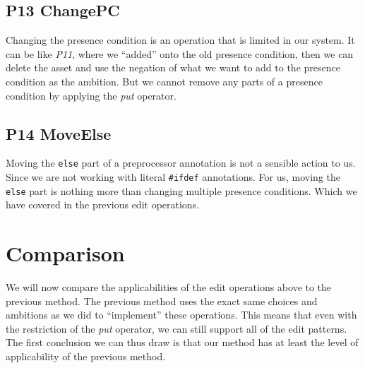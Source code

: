 \subsection*{P13 ChangePC}
Changing the presence condition is an operation that is limited in our system.
It can be like \emph{P11}, where we ``added'' onto the old presence condition,
then we can delete the asset and use the negation of what we want to add to
the presence condition as the ambition. But we cannot remove any parts of a
presence condition by applying the \emph{put} operator.

\subsection*{P14 MoveElse}
Moving the \texttt{else} part of a preprocessor annotation is not a sensible action
to us. Since we are not working with literal \texttt{\#ifdef} annotations. For
us, moving the \texttt{else} part is nothing more than changing multiple presence
conditions. Which we have covered in the previous edit operations.

\section{Comparison}
We will now compare the applicabilities of the edit operations above to the previous
method. The previous method uses the exact same choices and ambitions as we did to
``implement'' these operations. This means that even with the restriction of the
\emph{put} operator, we can still support all of the edit patterns. The first
conclusion we can thus draw is that our method has at least the level of applicability
of the previous method.

